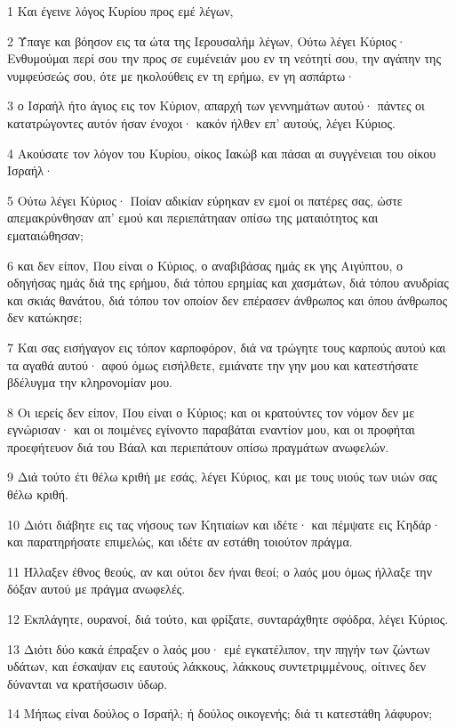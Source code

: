 \par 1 Και έγεινε λόγος Κυρίου προς εμέ λέγων,
\par 2 Ύπαγε και βόησον εις τα ώτα της Ιερουσαλήμ λέγων, Ούτω λέγει Κύριος· Ενθυμούμαι περί σου την προς σε ευμένειάν μου εν τη νεότητί σου, την αγάπην της νυμφεύσεώς σου, ότε με ηκολούθεις εν τη ερήμω, εν γη ασπάρτω·
\par 3 ο Ισραήλ ήτο άγιος εις τον Κύριον, απαρχή των γεννημάτων αυτού· πάντες οι κατατρώγοντες αυτόν ήσαν ένοχοι· κακόν ήλθεν επ' αυτούς, λέγει Κύριος.
\par 4 Ακούσατε τον λόγον του Κυρίου, οίκος Ιακώβ και πάσαι αι συγγένειαι του οίκου Ισραήλ·
\par 5 Ούτω λέγει Κύριος· Ποίαν αδικίαν εύρηκαν εν εμοί οι πατέρες σας, ώστε απεμακρύνθησαν απ' εμού και περιεπάτηααν οπίσω της ματαιότητος και εματαιώθησαν;
\par 6 και δεν είπον, Που είναι ο Κύριος, ο αναβιβάσας ημάς εκ γης Αιγύπτου, ο οδηγήσας ημάς διά της ερήμου, διά τόπου ερημίας και χασμάτων, διά τόπου ανυδρίας και σκιάς θανάτου, διά τόπου τον οποίον δεν επέρασεν άνθρωπος και όπου άνθρωπος δεν κατώκησε;
\par 7 Και σας εισήγαγον εις τόπον καρποφόρον, διά να τρώγητε τους καρπούς αυτού και τα αγαθά αυτού· αφού όμως εισήλθετε, εμιάνατε την γην μου και κατεστήσατε βδέλυγμα την κληρονομίαν μου.
\par 8 Οι ιερείς δεν είπον, Που είναι ο Κύριος; και οι κρατούντες τον νόμον δεν με εγνώρισαν· και οι ποιμένες εγίνοντο παραβάται εναντίον μου, και οι προφήται προεφήτευον διά του Βάαλ και περιεπάτουν οπίσω πραγμάτων ανωφελών.
\par 9 Διά τούτο έτι θέλω κριθή με εσάς, λέγει Κύριος, και με τους υιούς των υιών σας θέλω κριθή.
\par 10 Διότι διάβητε εις τας νήσους των Κητιαίων και ιδέτε· και πέμψατε εις Κηδάρ· και παρατηρήσατε επιμελώς, και ιδέτε αν εστάθη τοιούτον πράγμα.
\par 11 Ήλλαξεν έθνος θεούς, αν και ούτοι δεν ήναι θεοί; ο λαός μου όμως ήλλαξε την δόξαν αυτού με πράγμα ανωφελές.
\par 12 Εκπλάγητε, ουρανοί, διά τούτο, και φρίξατε, συνταράχθητε σφόδρα, λέγει Κύριος.
\par 13 Διότι δύο κακά έπραξεν ο λαός μου· εμέ εγκατέλιπον, την πηγήν των ζώντων υδάτων, και έσκαψαν εις εαυτούς λάκκους, λάκκους συντετριμμένους, οίτινες δεν δύνανται να κρατήσωσιν ύδωρ.
\par 14 Μήπως είναι δούλος ο Ισραήλ; ή δούλος οικογενής; διά τι κατεστάθη λάφυρον;
